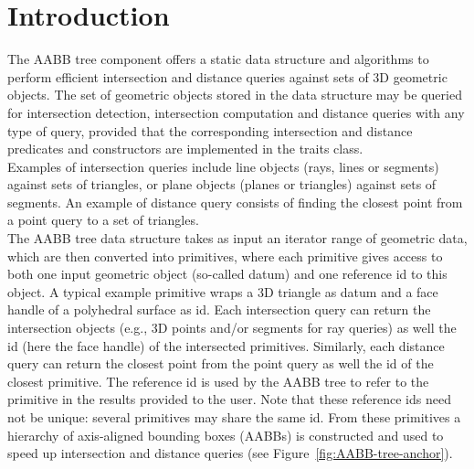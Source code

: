\section{Introduction}
\label{AABB_tree_section_intro}

The AABB tree component offers a static data structure and algorithms to perform efficient intersection and distance queries against sets of 3D geometric objects. The set of geometric objects stored in the data structure may be queried for intersection detection, intersection computation and distance queries with any type of query, provided that the corresponding intersection and distance predicates and constructors are implemented in the traits class.\\

Examples of intersection queries include line objects (rays, lines or segments) against sets of triangles, or plane objects (planes or triangles) against sets of segments. An example of distance query consists of finding the closest point from a point query to a set of triangles.\\

The AABB tree data structure takes as input an iterator range of geometric data, which are then converted into primitives, where each primitive gives access to both one input geometric object (so-called datum) and one reference id to this object. A typical example primitive wraps a 3D triangle as datum and a face handle of a polyhedral surface as id. Each intersection query can return the intersection objects (e.g., 3D points and/or segments for ray queries) as well the id (here the face handle) of the intersected primitives. Similarly, each distance query can return the closest point from the point query as well the id of the closest primitive. The reference id is used by the AABB tree to refer to the primitive in the results provided to the user. Note that these reference ids need not be unique: several primitives may share the same id. From these primitives a hierarchy of axis-aligned bounding boxes (AABBs) is constructed and used to speed up intersection and distance queries (see Figure~\ref{fig:AABB-tree-anchor}). 

